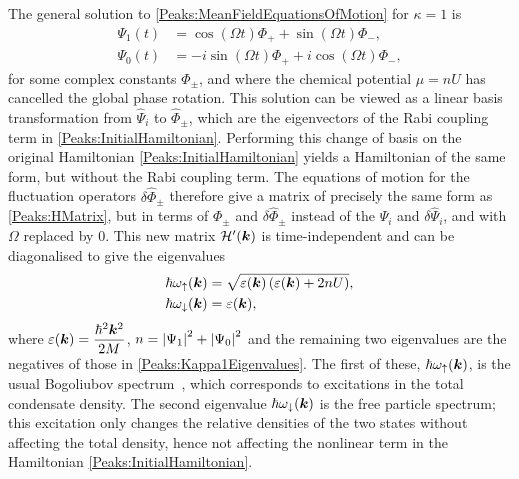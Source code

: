 The general solution to \eqref{Peaks:MeanFieldEquationsOfMotion} for $\kappa = 1$ is
\begin{subequations}
    \label{Peaks:Kappa1MeanFieldSolution}
    \begin{align}
        \Psi_1(t) &= \cos(\Omega t) \Phi_+ + \sin(\Omega t) \Phi_-, \\
        \Psi_0(t) &= -i\sin(\Omega t) \Phi_+ + i\cos(\Omega t) \Phi_-,
    \end{align}
\end{subequations}
for some complex constants $\Phi_\pm$, and where the chemical potential $\mu = n U$ has cancelled the global phase rotation. This solution can be viewed as a linear basis transformation from $\hat{\Psi}_i$ to $\hat{\Phi}_\pm$, which are the eigenvectors of the Rabi coupling term in \eqref{Peaks:InitialHamiltonian}. Performing this change of basis on the original Hamiltonian \eqref{Peaks:InitialHamiltonian} yields a Hamiltonian of the same form, but without the Rabi coupling term. The equations of motion for the fluctuation operators $\delta\hat{\Phi}_\pm$ therefore give a matrix of precisely the same form as \eqref{Peaks:HMatrix}, but in terms of $\Phi_\pm$ and $\delta\hat{\Phi}_\pm$ instead of the $\Psi_i$ and $\delta\hat{\Psi}_i$, and with $\Omega$ replaced by 0. This new matrix $\mathcal{H}'(\bm{k})$ is time-independent and can be diagonalised to give the eigenvalues
\begin{subequations}
    \label{Peaks:Kappa1Eigenvalues}
    \begin{align}
        \hbar \omega_\uparrow(\vect{k}) &= \sqrt{\varepsilon(\vect{k})\left(\varepsilon(\vect{k}) + 2 n U\right)},\\
        \hbar \omega_\downarrow(\vect{k}) &= \varepsilon(\vect{k}),
    \end{align}
\end{subequations}
where $\displaystyle\varepsilon(\bm{k}) = \frac{\hbar^2\bm{k}^2}{2M}$, $n= \left|\Psi_1\right|^2 + \left|\Psi_0\right|^2$ and the remaining two eigenvalues are the negatives of those in \eqref{Peaks:Kappa1Eigenvalues}. The first of these, $\hbar \omega_\uparrow(\bm{k})$, is the usual Bogoliubov spectrum~\citep{Bogoliubov:1947}, which corresponds to excitations in the total condensate density. The second eigenvalue $\hbar \omega_\downarrow(\bm{k})$ is the free particle spectrum; this excitation only changes the relative densities of the two states without affecting the total density, hence not affecting the nonlinear term in the Hamiltonian \eqref{Peaks:InitialHamiltonian}.

